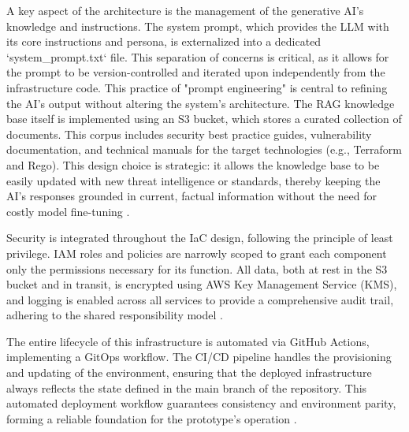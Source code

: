 A key aspect of the architecture is the management of the generative AI's knowledge and instructions. The system prompt, which provides the LLM with its core instructions and persona, is externalized into a dedicated `system_prompt.txt` file. This separation of concerns is critical, as it allows for the prompt to be version-controlled and iterated upon independently from the infrastructure code. This practice of "prompt engineering" is central to refining the AI's output without altering the system's architecture. The RAG knowledge base itself is implemented using an S3 bucket, which stores a curated collection of documents. This corpus includes security best practice guides, vulnerability documentation, and technical manuals for the target technologies (e.g., Terraform and Rego). This design choice is strategic: it allows the knowledge base to be easily updated with new threat intelligence or standards, thereby keeping the AI's responses grounded in current, factual information without the need for costly model fine-tuning \cite{ozgur_simple_2024}.

Security is integrated throughout the IaC design, following the principle of least privilege. IAM roles and policies are narrowly scoped to grant each component only the permissions necessary for its function. All data, both at rest in the S3 bucket and in transit, is encrypted using AWS Key Management Service (KMS), and logging is enabled across all services to provide a comprehensive audit trail, adhering to the shared responsibility model \cite{sarathe_krisshnan_jutoo_vijayaraghavan_policy_2025}.

The entire lifecycle of this infrastructure is automated via GitHub Actions, implementing a GitOps workflow. The CI/CD pipeline handles the provisioning and updating of the environment, ensuring that the deployed infrastructure always reflects the state defined in the main branch of the repository. This automated deployment workflow guarantees consistency and environment parity, forming a reliable foundation for the prototype's operation \cite{wego_gitops_2018}.


